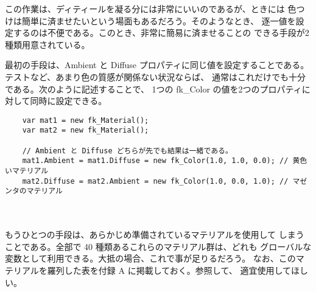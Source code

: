 この作業は、ディティールを凝る分には非常にいいのであるが、ときには
色つけは簡単に済ませたいという場面もあるだろう。そのようなとき、
逐一値を設定するのは不便である。このとき、非常に簡易に済ませることの
できる手段が2種類用意されている。

最初の手段は、Ambient と Diffuse プロパティに同じ値を設定することである。
テストなど、あまり色の質感が関係ない状況ならば、
通常はこれだけでも十分である。次のように記述することで、
1つの fk\_Color の値を2つのプロパティに対して同時に設定できる。
\\
\begin{screen}
\begin{verbatim}
    var mat1 = new fk_Material();
    var mat2 = new fk_Material();

    // Ambient と Diffuse どちらが先でも結果は一緒である。
    mat1.Ambient = mat1.Diffuse = new fk_Color(1.0, 1.0, 0.0); // 黄色いマテリアル
    mat2.Diffuse = mat2.Ambient = new fk_Color(1.0, 0.0, 1.0); // マゼンタのマテリアル
\end{verbatim}
\end{screen}
\\ ~ \\
もうひとつの手段は、あらかじめ準備されているマテリアルを使用して
しまうことである。全部で 40 種類あるこれらのマテリアル群は、どれも
グローバルな変数として利用できる。大抵の場合、これで事が足りるだろう。
なお、このマテリアルを羅列した表を付録 A に掲載しておく。参照して、
適宜使用してほしい。
